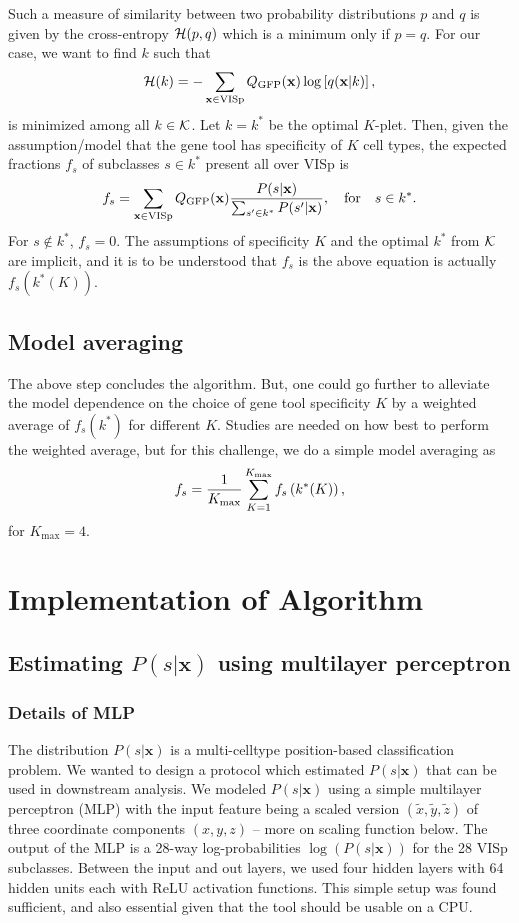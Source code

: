\documentclass{article}
\newcommand\beq{\begin{equation}}
\newcommand\eeq[1]{\label{#1}\end{equation}}
\begin{document}
Such a measure of similarity between two probability distributions $p$ and $q$ is given by the cross-entropy ${\cal H}(p,q)$ which is a minimum only if $p=q$. For our case, we want to find $k$ such that 
\beq
{\cal H}(k) = - \sum_{\mathbf{x}\in\text{VISp}} Q_{\rm GFP}(\mathbf{x}) \log\left[ q(\mathbf{x}|k)\right],
\eeq{cross}
is minimized among all $k\in {\cal K}$. Let $k=k^*$ be the optimal $K$-plet. Then, given the assumption/model that the gene tool has specificity of $K$ cell types, the expected fractions $f_s$ of subclasses $s\in k^*$ present all over VISp is
\beq
f_s =  \sum_{\mathbf{x}\in\text{VISp}} Q_{\rm GFP}(\mathbf{x}) \frac{P(s|\mathbf{x})}{\sum_{s'\in k^*} P(s'|\mathbf{x}) },\quad\text{for}\quad s\in k^*.
\eeq{frac}
For $s\notin k^*$, $f_s=0$.
The assumptions of specificity $K$ and the optimal $k^*$ from ${\cal K}$ are implicit, and it is to be understood that 
$f_s$ is the above equation is actually $f_s\left(k^*(K)\right)$.

\subsection{Model averaging}
The above step concludes the algorithm. But, one could go further to alleviate the model dependence on the choice of gene tool specificity $K$ by a weighted average of $f_s(k^*)$ for different $K$. Studies are needed on how best to perform the weighted average, but for this challenge, we do a simple model averaging as 
\beq
f_s = \frac{1}{K_{\max}} \sum_{K=1}^{K_{\rm max}} f_s\left(k^*(K)\right),
\eeq{modav}
for $K_{\max}=4$.


\section{Implementation of Algorithm}

\subsection{Estimating $P(s|\mathbf{x})$ using multilayer perceptron}

\subsubsection{Details of MLP}

The distribution $P(s|\mathbf{x})$ is a multi-celltype position-based
classification problem.  We wanted to design a protocol which
estimated $P(s|\mathbf{x})$ that can be used in downstream analysis.
We modeled $P(s|\mathbf{x})$ using a simple multilayer perceptron
(MLP) with the input feature being a scaled version $(\tilde{x},
\tilde{y}, \tilde{z})$ of three coordinate components $(x,y,z)$ --
more on scaling function below. The output of the MLP is a 28-way
log-probabilities $\log(P(s|\mathbf{x}))$ for the 28 VISp subclasses.
Between the input and out layers, we used four hidden layers with
64 hidden units each with ReLU activation functions. This simple
setup was found sufficient, and also essential given that the tool
should be usable on a CPU.
\end{document}
